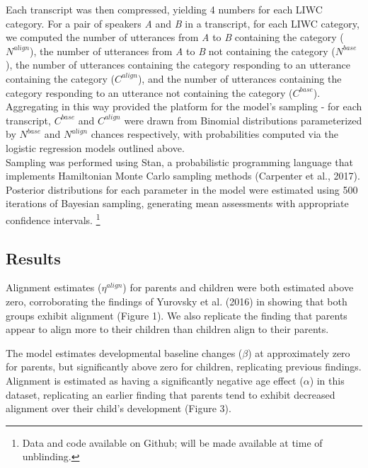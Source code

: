 \documentclass[10pt, letterpaper]{article}
\begin{document}
Each transcript was then compressed, yielding 4 numbers for each LIWC
category. For a pair of speakers \emph{A} and \emph{B} in a transcript,
for each LIWC category, we computed the number of utterances from
\emph{A} to \emph{B} containing the category (\(N^{align}\)), the number
of utterances from \emph{A} to \emph{B} not containing the category
(\(N^{base}\)), the number of utterances containing the category
responding to an utterance containing the category (\(C^{align}\)), and
the number of utterances containing the category responding to an
utterance not containing the category (\(C^{base}\)). Aggregating in
this way provided the platform for the model's sampling - for each
transcript, \(C^{base}\) and \(C^{align}\) were drawn from Binomial
distributions parameterized by \(N^{base}\) and \(N^{align}\) chances
respectively, with probabilities computed via the logistic regression
models outlined above.\\
Sampling was performed using Stan, a probabilistic programming language
that implements Hamiltonian Monte Carlo sampling methods (Carpenter et
al., 2017). Posterior distributions for each parameter in the model were
estimated using 500 iterations of Bayesian sampling, generating mean
assessments with appropriate confidence intervals.
\footnote{Data and code available on Github; will be made available at time of unblinding.}

\hypertarget{results}{%
\subsection{Results}\label{results}}

Alignment estimates (\(\eta^{align}\)) for parents and children were
both estimated above zero, corroborating the findings of Yurovsky et al.
(2016) in showing that both groups exhibit alignment (Figure 1). We also
replicate the finding that parents appear to align more to their
children than children align to their parents.

The model estimates developmental baseline changes (\(\beta\)) at
approximately zero for parents, but significantly above zero for
children, replicating previous findings. Alignment is estimated as
having a significantly negative age effect (\(\alpha\)) in this dataset,
replicating an earlier finding that parents tend to exhibit decreased
alignment over their child's development (Figure 3).
\end{document}
